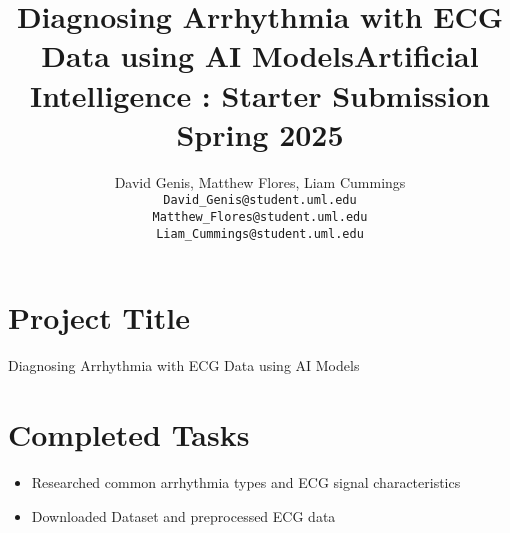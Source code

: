 \documentclass[12pt]{article}
\title{Diagnosing Arrhythmia with ECG Data using AI Models}
\author{
  David Genis, Matthew Flores, Liam Cummings \\
  \texttt{David\_Genis@student.uml.edu} \\
  \texttt{Matthew\_Flores@student.uml.edu} \\
  \texttt{Liam\_Cummings@student.uml.edu}
}
\date{}
\title{Artificial Intelligence \secno: Starter Submission \\ Spring 2025}
\begin{document}
\maketitle


\section*{Project Title}
Diagnosing Arrhythmia with ECG Data using AI Models

\section*{Completed Tasks}
\begin{itemize}
    \item Researched common arrhythmia types and ECG signal characteristics
    \item Downloaded Dataset and preprocessed ECG data
\end{itemize}

\newpage

\end{document}
